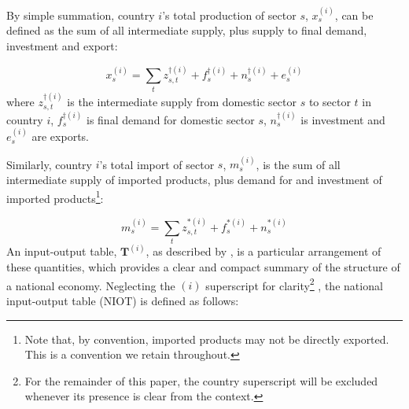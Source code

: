 \documentclass[a4paper]{article}
\begin{document}
By simple summation, country $i$'s total production of sector $s$, $x_s^{(i)}$, can be defined as the sum of all intermediate supply, plus supply to final demand, investment and export:

\begin{equation}\label{eqn:x}
x_s^{(i)}=\sum\limits_{t}z_{s,t}^{\dagger(i)} + f_s^{\dagger(i)} + n_s^{\dagger(i)} + e_s^{(i)}
\end{equation}
where $z_{s,t}^{\dagger(i)}$ is the intermediate supply from domestic sector $s$ to sector $t$ in country $i$, $f_s^{\dagger(i)}$ is final demand for domestic sector $s$, $n_s^{\dagger(i)}$ is investment and $e_s^{(i)}$ are exports.

Similarly, country $i$'s total import of sector $s$, $m_s^{(i)}$, is the sum of all intermediate supply of imported products, plus demand for and investment of imported products\footnote{
Note that, by convention, imported products may not be directly exported.
This is a convention we retain throughout.
}:

\begin{equation}\label{eqn:m}
m_s^{(i)}=\sum\limits_{t}z_{s,t}^{*(i)} + f_s^{*(i)} + n_s^{*(i)}
\end{equation}
An input-output table, $\boldsymbol{T}^{(i)}$, as described by \textcite{miller_input-output_1985}, is a particular arrangement of these quantities, which provides a clear and compact summary of the structure of a national economy.
Neglecting the $(i)$ superscript for clarity\footnote{
For the remainder of this paper, the country superscript will be excluded whenever its presence is clear from the context.}
, the national input-output table (NIOT) is defined as follows:
\end{document}
